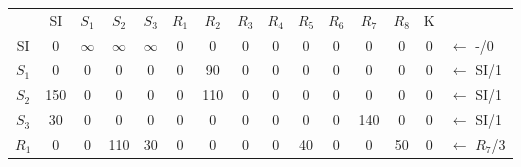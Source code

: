 \documentclass[12pt]{article}
\begin{document}
\begin{enumerate}
\begin{tabular}{|c|c|c|c|c|c|c|c|c|c|c|c|c|c|l}
      & SI  & $S_1$                           & $S_2$                           & $S_3$                           & $R_1$                      & $R_2$                      & $R_3$                      & $R_4$                     & $R_5$                      & $R_6$                     & $R_7$                      & $R_8$                      & K                          &                        \\ \cline{1-14}
SI    & 0   & {\color[HTML]{000000} $\infty$} & {\color[HTML]{FE0000} $\infty$} & {\color[HTML]{000000} $\infty$} & {\color[HTML]{000000} 0}   & {\color[HTML]{000000} 0}   & {\color[HTML]{000000} 0}   & {\color[HTML]{000000} 0}  & {\color[HTML]{000000} 0}   & {\color[HTML]{000000} 0}  & {\color[HTML]{000000} 0}   & {\color[HTML]{000000} 0}   & {\color[HTML]{000000} 0}   & ${\leftarrow}$ -/0     \\ \cline{1-14}
$S_1$ & 0   & {\color[HTML]{000000} 0}        & {\color[HTML]{000000} 0}        & {\color[HTML]{000000} 0}        & {\color[HTML]{000000} 0}   & {\color[HTML]{000000} 90}  & {\color[HTML]{000000} 0}   & {\color[HTML]{000000} 0}  & {\color[HTML]{000000} 0}   & {\color[HTML]{000000} 0}  & {\color[HTML]{000000} 0}   & {\color[HTML]{000000} 0}   & {\color[HTML]{000000} 0}   & ${\leftarrow}$ SI/1    \\ \cline{1-14}
$S_2$ & 150 & {\color[HTML]{000000} 0}        & {\color[HTML]{000000} 0}        & {\color[HTML]{000000} 0}        & {\color[HTML]{000000} 0}   & {\color[HTML]{FE0000} 110} & {\color[HTML]{000000} 0}   & {\color[HTML]{000000} 0}  & {\color[HTML]{000000} 0}   & {\color[HTML]{000000} 0}  & {\color[HTML]{000000} 0}   & {\color[HTML]{000000} 0}   & {\color[HTML]{000000} 0}   & ${\leftarrow}$ SI/1    \\ \cline{1-14}
$S_3$ & 30  & {\color[HTML]{000000} 0}        & {\color[HTML]{000000} 0}        & {\color[HTML]{000000} 0}        & {\color[HTML]{000000} 0}   & {\color[HTML]{000000} 0}   & {\color[HTML]{000000} 0}   & {\color[HTML]{000000} 0}  & {\color[HTML]{000000} 0}   & {\color[HTML]{000000} 0}  & {\color[HTML]{000000} 140} & {\color[HTML]{000000} 0}   & {\color[HTML]{000000} 0}   & ${\leftarrow}$ SI/1    \\ \cline{1-14}
$R_1$ & 0   & {\color[HTML]{000000} 0}        & {\color[HTML]{000000} 110}      & {\color[HTML]{000000} 30}       & {\color[HTML]{000000} 0}   & {\color[HTML]{000000} 0}   & {\color[HTML]{000000} 0}   & {\color[HTML]{000000} 0}  & {\color[HTML]{000000} 40}  & {\color[HTML]{000000} 0}  & {\color[HTML]{000000} 0}   & {\color[HTML]{000000} 50}  & {\color[HTML]{000000} 0}   &    ${\leftarrow}$ $R_7$/3                    \\ \cline{1-14}

\end{tabular}
\end{enumerate}
\end{document}
